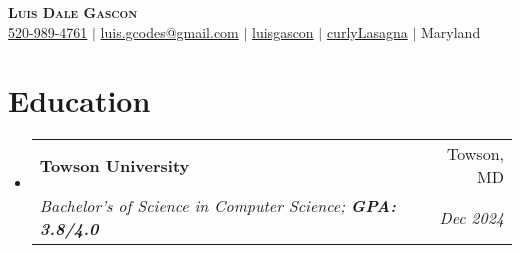 \documentclass[letterpaper,11pt]{article}
\makeatletter
\newcommand{\resumeItem}[1]{
  \item\small{
    {#1 \vspace{-2pt}}
  }
}
\newcommand{\resumeSubheading}[4]{
  \vspace{-2pt}\item
    \begin{tabular*}{0.97\textwidth}[t]{l@{\extracolsep{\fill}}r}
      \textbf{#1} & #2 \\
      \textit{\small#3} & \textit{\small #4} \\
    \end{tabular*}\vspace{-7pt}
}
\newcommand{\resumeSubHeadingListStart}{\begin{itemize}[leftmargin=0.15in, label={}]}
\newcommand{\resumeSubHeadingListEnd}{\end{itemize}}
\newcommand{\resumeItemListStart}{\begin{itemize}}
\newcommand{\resumeItemListEnd}{\end{itemize}\vspace{-5pt}}
\makeatother
\begin{document}

\begin{center}
  \textbf{\Huge \scshape Luis Dale Gascon} \\ \vspace{3pt}
  \small
  \faMobile \hspace{.5pt} \href{tel:5209894761}{520-989-4761}
  $|$
  \faAt \hspace{.5pt} \href{mailto:luis.gcodes@gmail.com}{luis.gcodes@gmail.com}
  $|$
  \faLinkedinSquare \hspace{.5pt} \href{https://www.linkedin.com/in/luisgascon/}{luisgascon}
  $|$
  \faGithub \hspace{.5pt} \href{https://github.com/curlyLasagna}{curlyLasagna}
  $|$
  \faMapMarker \hspace{.5pt} {Maryland}
\end{center}




\section{Education}
\vspace{3pt}
\resumeSubHeadingListStart

\resumeSubheading
{Towson University}{Towson, MD}
{Bachelor's of Science in Computer Science; \textbf{GPA: 3.8/4.0}}{Dec 2024}
\vspace{3pt}
\resumeSubHeadingListEnd




\end{document}

